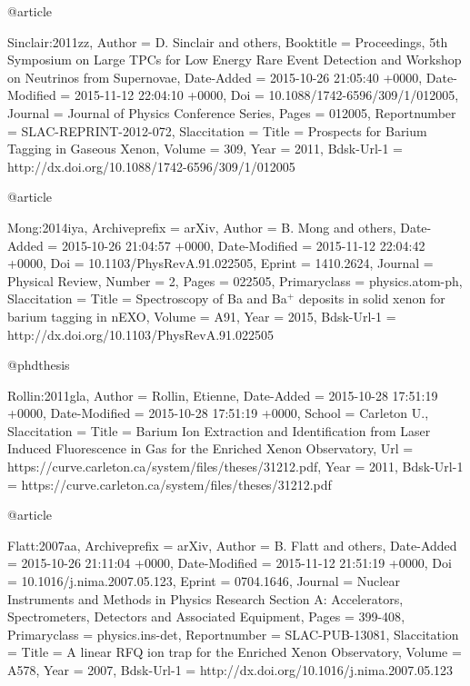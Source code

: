 {{{{{@article{Sinclair:2011zz,
	Author = {D. Sinclair and others},
	Booktitle = {{Proceedings, 5th Symposium on Large TPCs for Low Energy Rare Event Detection and Workshop on Neutrinos from Supernovae}},
	Date-Added = {2015-10-26 21:05:40 +0000},
	Date-Modified = {2015-11-12 22:04:10 +0000},
	Doi = {10.1088/1742-6596/309/1/012005},
	Journal = {Journal of Physics Conference Series},
	Pages = {012005},
	Reportnumber = {SLAC-REPRINT-2012-072},
	Slaccitation = {%
	Title = {{Prospects for Barium Tagging in Gaseous Xenon}},
	Volume = {309},
	Year = {2011},
	Bdsk-Url-1 = {http://dx.doi.org/10.1088/1742-6596/309/1/012005}}

@article{Mong:2014iya,
	Archiveprefix = {arXiv},
	Author = {B. Mong and others},
	Date-Added = {2015-10-26 21:04:57 +0000},
	Date-Modified = {2015-11-12 22:04:42 +0000},
	Doi = {10.1103/PhysRevA.91.022505},
	Eprint = {1410.2624},
	Journal = {Physical Review},
	Number = {2},
	Pages = {022505},
	Primaryclass = {physics.atom-ph},
	Slaccitation = {%
	Title = {{Spectroscopy of Ba and Ba$^+$ deposits in solid xenon for barium tagging in nEXO}},
	Volume = {A91},
	Year = {2015},
	Bdsk-Url-1 = {http://dx.doi.org/10.1103/PhysRevA.91.022505}}
	
@phdthesis{Rollin:2011gla,
	Author = {Rollin, Etienne},
	Date-Added = {2015-10-28 17:51:19 +0000},
	Date-Modified = {2015-10-28 17:51:19 +0000},
	School = {Carleton U.},
	Slaccitation = {%
	Title = {{Barium Ion Extraction and Identification from Laser Induced Fluorescence in Gas for the Enriched Xenon Observatory}},
	Url = {https://curve.carleton.ca/system/files/theses/31212.pdf},
	Year = {2011},
	Bdsk-Url-1 = {https://curve.carleton.ca/system/files/theses/31212.pdf}}
	
@article{Flatt:2007aa,
	Archiveprefix = {arXiv},
	Author = {B. Flatt and others},
	Date-Added = {2015-10-26 21:11:04 +0000},
	Date-Modified = {2015-11-12 21:51:19 +0000},
	Doi = {10.1016/j.nima.2007.05.123},
	Eprint = {0704.1646},
	Journal = {Nuclear Instruments and Methods in Physics Research Section A: Accelerators, Spectrometers, Detectors and Associated Equipment},
	Pages = {399-408},
	Primaryclass = {physics.ins-det},
	Reportnumber = {SLAC-PUB-13081},
	Slaccitation = {%
	Title = {{A linear RFQ ion trap for the Enriched Xenon Observatory}},
	Volume = {A578},
	Year = {2007},
	Bdsk-Url-1 = {http://dx.doi.org/10.1016/j.nima.2007.05.123}}

}}}}}}}}}
